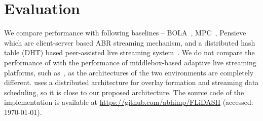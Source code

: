 \section{Evaluation}
We compare {\our} performance with following baselines -- BOLA~\cite{bola2-acm-mmsys2018}, MPC~\cite{MPC-SIGCOMM-2015}, Pensieve~\cite{mao2017neural} which are client-server based ABR streaming mechanism, and a distributed hash table (DHT) based peer-assisted live streaming system~\cite{shen2013dht}. 
We do not compare the performance of {\our} with the performance of middlebox-based adaptive live streaming platforms, such as~\cite{detti2016tracker,payberah2012clive,wang2014migration,khalid2019sdn}, as the architectures of the two environments are completely different. \cite{shen2013dht} uses a distributed architecture for overlay formation and streaming data scheduling, so it is close to our proposed architecture. 
The source code of the implementation is available at \url{https://github.com/abhimp/FLiDASH} (accessed: \today).

